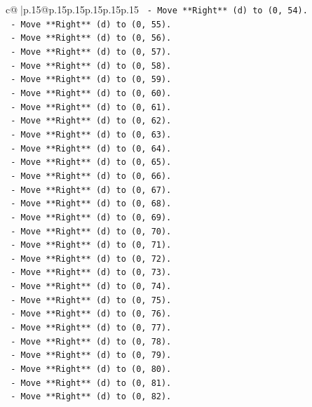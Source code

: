\documentclass{article}
\begin{document}
{\begin{supertabular}{c@{$\;$}|p{.15\linewidth}@{}p{.15\linewidth}p{.15\linewidth}p{.15\linewidth}p{.15\linewidth}p{.15\linewidth}}
{{{\texttt{    {-} Move **Right** (d) to (0, 54).} \\
\texttt{    {-} Move **Right** (d) to (0, 55).} \\
\texttt{    {-} Move **Right** (d) to (0, 56).} \\
\texttt{    {-} Move **Right** (d) to (0, 57).} \\
\texttt{    {-} Move **Right** (d) to (0, 58).} \\
\texttt{    {-} Move **Right** (d) to (0, 59).} \\
\texttt{    {-} Move **Right** (d) to (0, 60).} \\
\texttt{    {-} Move **Right** (d) to (0, 61).} \\
\texttt{    {-} Move **Right** (d) to (0, 62).} \\
\texttt{    {-} Move **Right** (d) to (0, 63).} \\
\texttt{    {-} Move **Right** (d) to (0, 64).} \\
\texttt{    {-} Move **Right** (d) to (0, 65).} \\
\texttt{    {-} Move **Right** (d) to (0, 66).} \\
\texttt{    {-} Move **Right** (d) to (0, 67).} \\
\texttt{    {-} Move **Right** (d) to (0, 68).} \\
\texttt{    {-} Move **Right** (d) to (0, 69).} \\
\texttt{    {-} Move **Right** (d) to (0, 70).} \\
\texttt{    {-} Move **Right** (d) to (0, 71).} \\
\texttt{    {-} Move **Right** (d) to (0, 72).} \\
\texttt{    {-} Move **Right** (d) to (0, 73).} \\
\texttt{    {-} Move **Right** (d) to (0, 74).} \\
\texttt{    {-} Move **Right** (d) to (0, 75).} \\
\texttt{    {-} Move **Right** (d) to (0, 76).} \\
\texttt{    {-} Move **Right** (d) to (0, 77).} \\
\texttt{    {-} Move **Right** (d) to (0, 78).} \\
\texttt{    {-} Move **Right** (d) to (0, 79).} \\
\texttt{    {-} Move **Right** (d) to (0, 80).} \\
\texttt{    {-} Move **Right** (d) to (0, 81).} \\
\texttt{    {-} Move **Right** (d) to (0, 82).} \\
}}}
\end{supertabular}}
\end{document}
